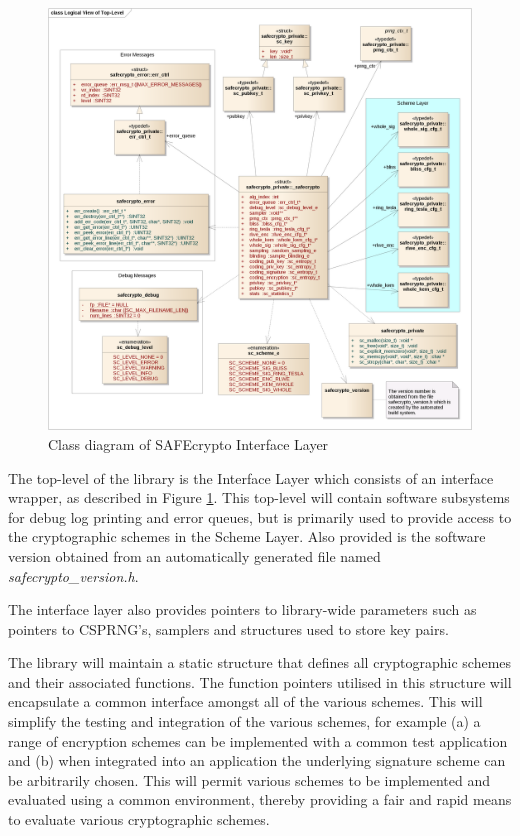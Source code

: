 \begin{figure}[!h]
\centering
\includegraphics[width=\textwidth]{libsafecrypto_top_logical_view.png}
\caption{Class diagram of SAFEcrypto Interface Layer}
\label{fig:safecrypto_top_level}
\end{figure}

The top-level of the library is the Interface Layer which consists of an interface wrapper, as described in Figure \ref{fig:safecrypto_top_level}. This top-level will contain software subsystems for debug log printing and error queues, but is primarily used to provide access to the cryptographic schemes in the Scheme Layer. Also provided is the software version obtained from an automatically generated file named \textit{safecrypto\_version.h}.

The interface layer also provides pointers to library-wide parameters such as pointers to CSPRNG's, samplers and structures used to store key pairs.

The library will maintain a static structure that defines all cryptographic schemes and their associated functions. The function pointers utilised in this structure will encapsulate a common interface amongst all of the various schemes. This will simplify the testing and integration of the various schemes, for example (a) a range of encryption schemes can be implemented with a common test application and (b) when integrated into an application the underlying signature scheme can be arbitrarily chosen. This will permit various schemes to be implemented and evaluated using a common environment, thereby providing a fair and rapid means to evaluate various cryptographic schemes.


